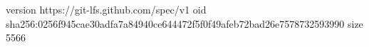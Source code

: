 version https://git-lfs.github.com/spec/v1
oid sha256:0256f945cae30adfa7a84940ce644472f5f0f49afeb72bad26e7578732593990
size 5566
